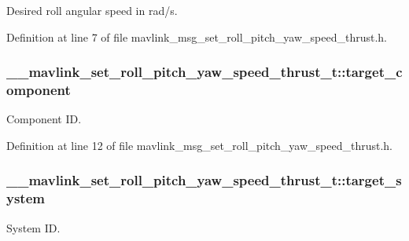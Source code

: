 Desired roll angular speed in rad/s. 



Definition at line 7 of file mavlink\-\_\-msg\-\_\-set\-\_\-roll\-\_\-pitch\-\_\-yaw\-\_\-speed\-\_\-thrust.\-h.

\hypertarget{struct____mavlink__set__roll__pitch__yaw__speed__thrust__t_a5b687c149bcad6c9b0bb53e489bff0a0}{
\subsubsection[{target\-\_\-component}]{ \-\_\-\-\_\-mavlink\-\_\-set\-\_\-roll\-\_\-pitch\-\_\-yaw\-\_\-speed\-\_\-thrust\-\_\-t\-::target\-\_\-component}}\label{struct____mavlink__set__roll__pitch__yaw__speed__thrust__t_a5b687c149bcad6c9b0bb53e489bff0a0}


Component I\-D. 



Definition at line 12 of file mavlink\-\_\-msg\-\_\-set\-\_\-roll\-\_\-pitch\-\_\-yaw\-\_\-speed\-\_\-thrust.\-h.

\hypertarget{struct____mavlink__set__roll__pitch__yaw__speed__thrust__t_a2a8b7411787c7696ac39b65c836c6156}{
\subsubsection[{target\-\_\-system}]{ \-\_\-\-\_\-mavlink\-\_\-set\-\_\-roll\-\_\-pitch\-\_\-yaw\-\_\-speed\-\_\-thrust\-\_\-t\-::target\-\_\-system}}\label{struct____mavlink__set__roll__pitch__yaw__speed__thrust__t_a2a8b7411787c7696ac39b65c836c6156}


System I\-D. 



